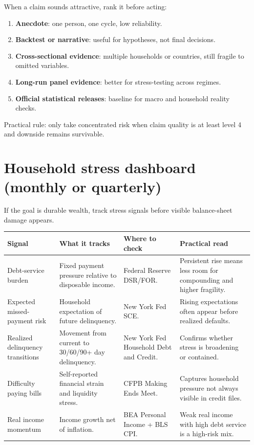 \documentclass[11pt,openany]{book}
\begin{document}
When a claim sounds attractive, rank it before acting:

\begin{enumerate}
  \item \textbf{Anecdote}: one person, one cycle, low reliability.
  \item \textbf{Backtest or narrative}: useful for hypotheses, not final decisions.
  \item \textbf{Cross-sectional evidence}: multiple households or countries, still fragile to omitted variables.
  \item \textbf{Long-run panel evidence}: better for stress-testing across regimes.
  \item \textbf{Official statistical releases}: baseline for macro and household reality checks.
\end{enumerate}

Practical rule: only take concentrated risk when claim quality is at least level 4 and downside remains survivable.

\section{Household stress dashboard (monthly or quarterly)}

If the goal is durable wealth, track stress signals before visible balance-sheet damage appears.

\begin{center}
\small
\begin{tabularx}{\textwidth}{>{\raggedright\arraybackslash}p{}>{\raggedright\arraybackslash}p{}>{\raggedright\arraybackslash}p{}X}
\toprule
\textbf{Signal} & \textbf{What it tracks} & \textbf{Where to check} & \textbf{Practical read} \\
\midrule
Debt-service burden & Fixed payment pressure relative to disposable income. & Federal Reserve DSR/FOR. & Persistent rise means less room for compounding and higher fragility. \\
Expected missed-payment risk & Household expectation of future delinquency. & New York Fed SCE. & Rising expectations often appear before realized defaults. \\
Realized delinquency transitions & Movement from current to 30/60/90+ day delinquency. & New York Fed Household Debt and Credit. & Confirms whether stress is broadening or contained. \\
Difficulty paying bills & Self-reported financial strain and liquidity stress. & CFPB Making Ends Meet. & Captures household pressure not always visible in credit files. \\
Real income momentum & Income growth net of inflation. & BEA Personal Income + BLS CPI. & Weak real income with high debt service is a high-risk mix. \\
\bottomrule
\end{tabularx}
\normalsize
\end{center}
\end{document}
